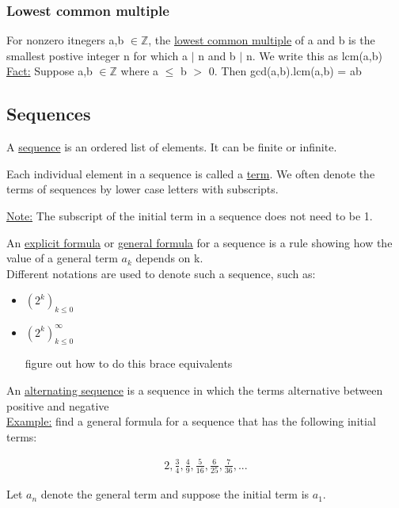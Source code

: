 \documentclass{article}
\begin{document}
\subsubsection{Lowest common multiple}

For nonzero itnegers a,b $\in \mathbb{Z}$, the \underline{lowest common multiple} of a and b is the smallest postive integer n for which a $|$ n and b $|$ n. We write this as lcm(a,b) \\

\underline{Fact:} Suppose a,b $\in \mathbb{Z}$ where a $\leq$ b $>$ 0. Then gcd(a,b).lcm(a,b) = ab

\subsection{Sequences}

A \underline{sequence} is an ordered list of elements. It can be finite or infinite.

Each individual element in a sequence is called a \underline{term}. We often denote the terms of sequences by lower case letters with subscripts.

\underline{Note:} The subscript of the initial term in a sequence does not need to be 1.

An \underline{explicit formula} or \underline{general formula} for a sequence is a rule showing how the value of a general term $a_{k}$ depends on k. \\

Different notations are used to denote such a sequence, such as:

\begin{itemize}
\item $(2^{k})_{k\leq0}$
\item $(2^{k})^{\infty}_{k\leq0}$
\item [figure out how to do this brace equivalents]
\end{itemize}

An \underline{alternating sequence} is a sequence in which the terms alternative between positive and negative \\

\underline{Example:} find a general formula for a sequence that has the following initial terms:

\begin{align}
2, \frac{3}{4}, \frac{4}{9}, \frac{5}{16}, \frac{6}{25}, \frac{7}{36}, ...
\end{align}

Let $a_{n}$ denote the general term and suppose the initial term is $a_{1}$. \\
\end{document}
